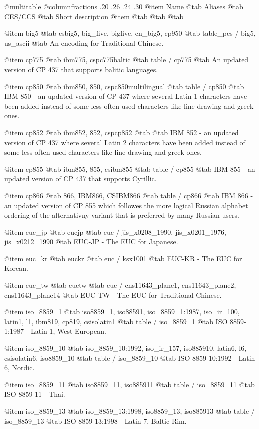 @multitable @columnfractions .20 .26 .24 .30
@item
Name
@tab
Aliases
@tab
CES/CCS
@tab
Short description
@item
@tab
@tab
@tab


@item
big5
@tab
csbig5, big_five, bigfive, cn_big5, cp950
@tab
table_pcs / big5, us_ascii 
@tab
An encoding for Traditional Chinese.


@item
cp775
@tab
ibm775, cspc775baltic
@tab
table / cp775
@tab
An updated version of CP 437 that supports balitic languages.


@item
cp850
@tab
ibm850, 850, cspc850multilingual
@tab
table / cp850
@tab
IBM 850 - an updated version of CP 437 where several Latin 1 characters have been
added instead of some less-often used characters like line-drawing and greek ones.


@item
cp852
@tab
ibm852, 852, cspcp852
@tab
@tab
IBM 852 - an updated version of CP 437 where several Latin 2 characters have been added
instead of some less-often used characters like line-drawing and greek ones.


@item
cp855
@tab
ibm855, 855, csibm855
@tab
table / cp855
@tab
IBM 855 - an updated version of CP 437 that supports Cyrillic.


@item
cp866
@tab
866, IBM866, CSIBM866
@tab
table / cp866
@tab
IBM 866 - an updated version of CP 855 which followes the more logical Russian alphabet 
ordering of the alternativny variant that is preferred by many Russian users.


@item
euc_jp
@tab
eucjp
@tab
euc / jis_x0208_1990, jis_x0201_1976, jis_x0212_1990
@tab
EUC-JP - The EUC for Japanese.


@item
euc_kr
@tab
euckr
@tab
euc / ksx1001
@tab
EUC-KR - The EUC for Korean.


@item
euc_tw
@tab
euctw
@tab
euc / cns11643_plane1, cns11643_plane2, cns11643_plane14
@tab
EUC-TW - The EUC for Traditional Chinese.


@item
iso_8859_1
@tab
iso8859_1, iso88591, iso_8859_1:1987, iso_ir_100, latin1, l1, ibm819, cp819, csisolatin1
@tab
table / iso_8859_1
@tab
ISO 8859-1:1987 - Latin 1, West European.


@item
iso_8859_10
@tab
iso_8859_10:1992, iso_ir_157, iso885910, latin6, l6, csisolatin6, iso8859_10
@tab
table / iso_8859_10
@tab
ISO 8859-10:1992 - Latin 6, Nordic.


@item
iso_8859_11
@tab
iso8859_11, iso885911
@tab
table / iso_8859_11
@tab
ISO 8859-11 - Thai.


@item
iso_8859_13
@tab
iso_8859_13:1998, iso8859_13, iso885913
@tab
table / iso_8859_13
@tab
ISO 8859-13:1998 - Latin 7, Baltic Rim.


